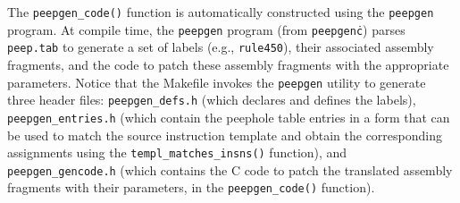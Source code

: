 \documentclass[9pt]{article}
\begin{document}
The {\tt peepgen\_code()} function is automatically constructed using
the {\tt peepgen} program. At compile time, the {\tt peepgen}
program (from {\tt peepgen\.c}) parses {\tt peep.tab} to generate a set
of labels (e.g., {\tt rule450}), their associated assembly fragments, and
the code to patch these assembly fragments with the appropriate parameters.
Notice that the Makefile invokes the {\tt peepgen} utility to generate
three header files: {\tt peepgen\_defs.h} (which declares and
defines the labels), {\tt peepgen\_entries.h} (which contain the peephole
table entries in a form that can be used to match the source instruction
template and obtain the corresponding assignments
using the {\tt templ\_matches\_insns()} function), and {\tt peepgen\_gencode.h}
(which contains the C code to patch the translated assembly fragments with
their parameters, in the {\tt peepgen\_code()} function).

\footnotesize{\small

}
\end{document}
